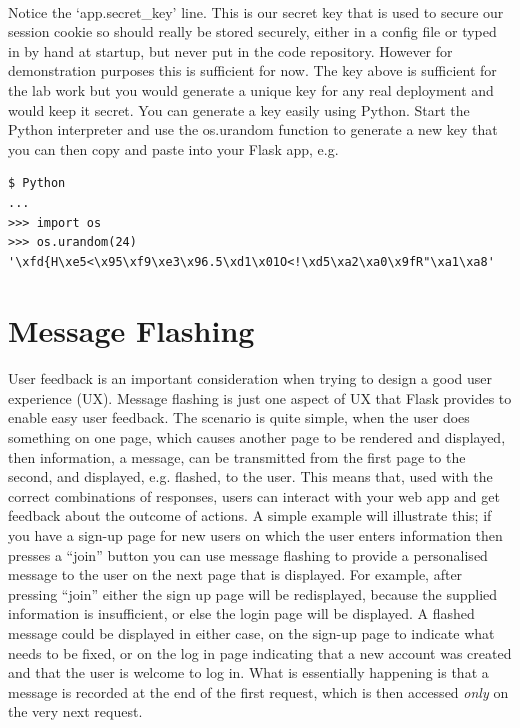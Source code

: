 \documentclass[12pt, a4paper, oneside]{book}
\begin{document}
{\paragraph{} Notice the `app.secret\_key' line. This is our secret key that is used to secure our session cookie so should really be stored securely, either in a config file or typed in by hand at startup, but never put in the code repository. However for demonstration purposes this is sufficient for now. The key above is sufficient for the lab work but you would generate a unique key for any real deployment and would keep it secret. You can generate a key easily using Python. Start the Python interpreter and use the os.urandom function to generate a new key that you can then copy and paste into your Flask app, e.g.

\begin{lstlisting}
$ Python
...
>>> import os
>>> os.urandom(24)
'\xfd{H\xe5<\x95\xf9\xe3\x96.5\xd1\x01O<!\xd5\xa2\xa0\x9fR"\xa1\xa8'
\end{lstlisting}


\section{Message Flashing}
\label{message-flashing}
\paragraph{} User feedback is an important consideration when trying to design a good user experience (UX). Message flashing is just one aspect of UX that Flask provides to enable easy user feedback. The scenario is quite simple, when the user does something on one page, which causes another page to be rendered and displayed, then information, a message, can be transmitted from the first page to the second, and displayed, e.g. flashed, to the user. This means that, used with the correct combinations of responses, users can interact with your web app and get feedback about the outcome of actions. A simple example will illustrate this; if you have a sign-up page for new users on which the user enters information then presses a ``join'' button you can use message flashing to provide a personalised message to the user on the next page that is displayed. For example, after pressing ``join'' either the sign up page will be redisplayed, because the supplied information is insufficient, or else the login page will be displayed. A flashed message could be displayed in either case, on the sign-up page to indicate what needs to be fixed, or on the log in page indicating that a new account was created and that the user is welcome to log in. What is essentially happening is that a message is recorded at the end of the first request, which is then accessed \emph{only} on the very next request.

}
\end{document}
